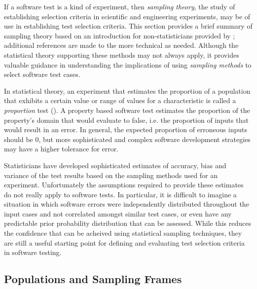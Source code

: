 
If a software test is a kind of experiment,
then \emph{sampling theory},
the study of establishing selection criteria
in scientific and engineering experiments,
may be of use in establishing test selection criteria.
This section provides a brief summary of sampling theory
based on an introduction for non-statisticians provided by \cite{Stuart1968};
additional references are made to the more technical \cite{Cochran1977} as needed.
Although the statistical theory supporting these methods may not always apply,
it provides valuable guidance in understanding
the implications of using \emph{sampling methods}
to select software test cases.

In statistical theory, 
an experiment that estimates the
proportion of a population that
exhibits a certain value or range of values for a characteristic
is called a \emph{proportion} test (\cite{Stuart1968}).
A property based software test
estimates the proportion of the property's domain
that would evaluate to false, 
i.e. the proportion of inputs that would result in an error.
In general, the expected proportion of erroneous inputs should be $0$,
but more sophisticated and complex software development strategies
may have a higher tolerance for error.

Statisticians have developed sophisticated estimates of
accuracy, bias and variance of the test results
based on the sampling methods used for an experiment.
Unfortunately the assumptions required to provide these estimates
do not really apply to software tests.
In particular, it is difficult to imagine a situation in which
software errors were independently distributed throughout the input cases
and not correlated amongst similar test cases,
or even have any predictable prior probability distribution that can be assessed.
While this reduces the confidence that can be acheived using statistical sampling techniques,
they are still a useful starting point for defining and evaluating test selection criteria in software testing.

\subsection{Populations and Sampling Frames}

